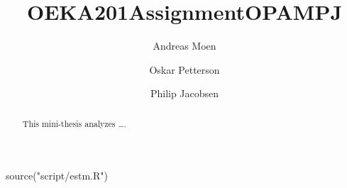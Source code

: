 \documentclass[
  letterpaper,
  DIV=11,
  numbers=noendperiod]{scrartcl}
\title{OEKA201AssignmentOPAMPJ}
\author{Andreas Moen \and Oskar Petterson \and Philip Jacobsen}
\date{}
\newenvironment{Shaded}{\begin{snugshade}}{\end{snugshade}}
\newcommand{\FunctionTok}[1]{\textcolor[rgb]{0.28,0.35,0.67}{#1}}
\newcommand{\NormalTok}[1]{\textcolor[rgb]{0.00,0.23,0.31}{#1}}
\newcommand{\StringTok}[1]{\textcolor[rgb]{0.13,0.47,0.30}{#1}}
\renewcommand*\contentsname{Table of contents}
\newcommand\contentsname{Table of contents}
\begin{document}
\maketitle
\begin{abstract}
This mini-thesis analyzes \ldots.
\end{abstract}

\renewcommand*\contentsname{Table of contents}
{
\setcounter{tocdepth}{3}
\tableofcontents
}
\listoffigures
\listoftables

\begin{Shaded}
\begin{Highlighting}[]
\FunctionTok{source}\NormalTok{(}\StringTok{"script/estm.R"}\NormalTok{)}
\end{Highlighting}
\end{Shaded}
\end{document}
